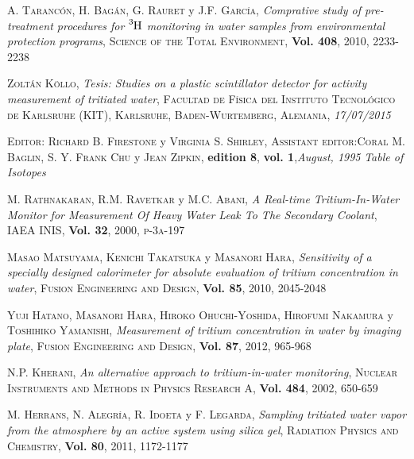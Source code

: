 \begin{thebibliography}{99}
 \textsc{A. Tarancón}, \textsc{H. Bagán}, \textsc{G. Rauret} y \textsc{J.F. García},
\textit{Comprative study of pre-treatment procedures for $\ce{^{3}H}$ monitoring in water samples from environmental protection programs}, \textsc{Science of the Total Environment}, \textbf{Vol. 408}, \textsc{2010}, \textsc{2233-2238}

 \textsc{Zoltán Köllo},
\textit{Tesis: Studies on a plastic scintillator detector for activity measurement of tritiated water}, \textsc{Facultad de Física del Instituto Tecnológico de Karlsruhe (KIT), Karlsruhe, Baden-Wurtemberg, Alemania}, \textit{17/07/2015}

 \textsc{Editor:} \textsc{Richard B. Firestone} y \textsc{Virginia S. Shirley}, \textsc{Assistant editor:}\textsc{Coral M. Baglin}, \textsc{S. Y. Frank Chu} y \textsc{Jean Zipkin}, \textbf{edition 8}, \textbf{vol. 1},\textit{August, 1995} 
\textit{Table of Isotopes}

 \textsc{M. Rathnakaran}, \textsc{R.M. Ravetkar} y \textsc{M.C. Abani},
\textit{A Real-time Tritium-In-Water Monitor for Measurement Of Heavy Water Leak To The Secondary Coolant}, \textsc{IAEA INIS}, \textbf{Vol. 32}, \textsc{2000}, \textsc{p-3a-197}

 \textsc{Masao Matsuyama}, \textsc{Kenichi Takatsuka} y \textsc{Masanori Hara}, 
\textit{Sensitivity of a specially designed calorimeter for absolute evaluation of tritium concentration in water}, \textsc{Fusion Engineering and Design}, \textbf{Vol. 85}, \textsc{2010}, \textsc{2045-2048}

 \textsc{Yuji Hatano}, \textsc{Masanori Hara}, \textsc{Hiroko Ohuchi-Yoshida}, \textsc{Hirofumi Nakamura} y \textsc{Toshihiko Yamanishi},
\textit{Measurement of tritium concentration in water by imaging plate}, \textsc{Fusion Engineering and Design}, \textbf{Vol. 87}, \textsc{2012}, \textsc{965-968}

\textsc{N.P. Kherani},
\textit{An alternative approach to tritium-in-water monitoring}, \textsc{Nuclear Instruments and Methods in Physics Research A}, \textbf{Vol. 484}, \textsc{2002}, \textsc{650-659}

 \textsc{M. Herrans}, \textsc{N. Alegría}, \textsc{R. Idoeta} y \textsc{F. Legarda},
\textit{Sampling tritiated water vapor from the atmosphere by an active system using silica gel}, \textsc{Radiation Physics and Chemistry}, \textbf{Vol. 80}, \textsc{2011}, \textsc{1172-1177}


\end{thebibliography}
